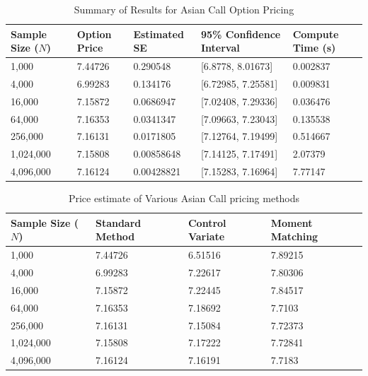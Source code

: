 \begin{table}[h!]
\centering
\caption{Summary of Results for Asian Call Option Pricing}
\begin{tabular}{|p{2cm}|p{2cm}|p{2.5cm}|p{3.8cm}|p{3cm}|}
\hline
\textbf{Sample Size (\(N\))} & \textbf{Option Price} & \textbf{Estimated SE} & \textbf{95\% Confidence Interval} & \textbf{Compute Time (s)} \\ \hline
1,000      & 7.44726  & 0.290548   & [6.8778, 8.01673]   & 0.002837  \\ \hline
4,000      & 6.99283  & 0.134176   & [6.72985, 7.25581]  & 0.009831  \\ \hline
16,000     & 7.15872  & 0.0686947  & [7.02408, 7.29336]  & 0.036476  \\ \hline
64,000     & 7.16353  & 0.0341347  & [7.09663, 7.23043]  & 0.135538  \\ \hline
256,000    & 7.16131  & 0.0171805  & [7.12764, 7.19499]  & 0.514667  \\ \hline
1,024,000  & 7.15808  & 0.00858648 & [7.14125, 7.17491]  & 2.07379   \\ \hline
4,096,000  & 7.16124  & 0.00428821 & [7.15283, 7.16964]  & 7.77147   \\ \hline
\end{tabular}
\end{table}
\begin{table}[h!]
\centering
\caption{Price estimate of Various Asian Call pricing methods}
\begin{tabular}{|p{2.5cm}|p{2.5cm}|p{2.5cm}|p{2.5cm}|}
\hline
\textbf{Sample Size (\(N\))} & \textbf{Standard Method} & \textbf{Control Variate} & \textbf{Moment Matching}\\ \hline
1,000      & 7.44726  & 6.51516 & 7.89215  \\ \hline
4,000      & 6.99283  & 7.22617 & 7.80306 \\ \hline
16,000     & 7.15872  & 7.22445 & 7.84517 \\ \hline
64,000     & 7.16353  & 7.18692 & 7.7103 \\ \hline
256,000    & 7.16131  & 7.15084 & 7.72373 \\ \hline
1,024,000  & 7.15808  & 7.17222 & 7.72841 \\ \hline
4,096,000  & 7.16124  & 7.16191 & 7.7183 \\ \hline
\end{tabular}
\end{table}

